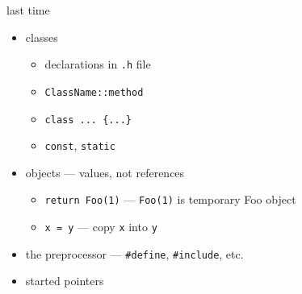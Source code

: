 \begin{frame}{last time}
    \begin{itemize}
    \item classes
        \begin{itemize}
        \item declarations in {\tt .h} file
        \item {\tt ClassName::method}
        \item {\tt class ... \{...\}\myemph{;}}
        \item {\tt const}, {\tt static}
        \end{itemize}
    \item objects --- values, not references
        \begin{itemize}
        \item {\tt return Foo(1)} --- {\tt Foo(1)} is temporary Foo object
        \item {\tt x = y} --- copy {\tt x} into {\tt y}
        \end{itemize}
    \item the preprocessor --- {\tt \#define}, {\tt \#include}, etc.
    \item started pointers
    \end{itemize}
\end{frame}
